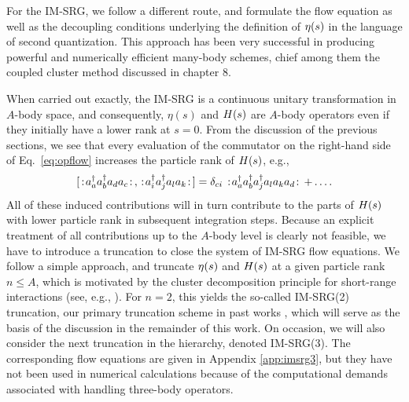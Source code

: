 For the IM-SRG, we follow a different route, and formulate the flow equation as well as the decoupling conditions underlying the definition of $\eta(s)$ in the language of second quantization. This approach has been very successful in producing powerful and numerically efficient many-body schemes, chief among them the coupled cluster method discussed in chapter 8.

When carried out exactly, the IM-SRG is a continuous unitary transformation in $A$-body space, and consequently, $\eta(s)$ and $H(s)$ are $A$-body operators even if they initially have a lower rank at $s=0$. From the discussion of the previous sections, we see that every evaluation of the commutator on the right-hand side of Eq.~\eqref{eq:opflow} increases the particle rank of $H(s)$, e.g.,
\begin{equation}\label{eq:induced}
  \comm{\nord{\aaO_{a}\aaO_{b}\aO_{d}\aO_{c}}}{\nord{\aaO_{i}\aaO_{j}\aO_{l}\aO_{k}}}= \delta_{ci}\nord{\aaO_{a}\aaO_{b}\aaO_{j}\aO_{l}\aO_{k}\aO_{d}}+\ldots.
\end{equation}
All of these induced contributions will in turn contribute to the
parts of $H(s)$ with lower particle rank in subsequent integration
steps. Because an explicit treatment of all contributions up to the
$A$-body level is clearly not feasible, we have to introduce a
truncation to close the system of IM-SRG flow equations. We follow a
simple approach, and truncate $\eta(s)$ and $H(s)$ at a given
particle rank $n\leq A$, which is motivated by the cluster
decomposition principle for short-range interactions (see, e.g.,
\cite{Weinberg:1996uf}). For $n=2$, this yields the so-called
IM-SRG(2) truncation, our primary truncation scheme in past works
\cite{Tsukiyama:2011uq,Tsukiyama:2012fk,Hergert:2013mi}, which will
serve as the basis of the discussion in the remainder of this work. On
occasion, we will also consider the next truncation in the hierarchy,
denoted IM-SRG(3). The corresponding flow equations are given in
Appendix \ref{app:imsrg3}, but they have not been used in numerical
calculations because of the computational demands associated with
handling three-body operators.

